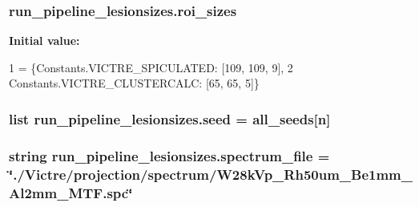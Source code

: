 \hypertarget{namespacerun__pipeline__lesionsizes_a3b75350f1aa1a1b47aa8ef34a06809db}{
\subsubsection[{roi\-\_\-sizes}]{\setlength{\rightskip}{0pt plus 5cm}run\-\_\-pipeline\-\_\-lesionsizes.\-roi\-\_\-sizes}}\label{namespacerun__pipeline__lesionsizes_a3b75350f1aa1a1b47aa8ef34a06809db}
{\bfseries Initial value\-:}
\begin{DoxyCode}
1 = \{Constants.VICTRE\_SPICULATED: [109, 109, 9],
2                  Constants.VICTRE\_CLUSTERCALC: [65, 65, 5]\}
\end{DoxyCode}
\hypertarget{namespacerun__pipeline__lesionsizes_ae359043ae5c4f2c1d8f12c0cdbffb932}{
\subsubsection[{seed}]{\setlength{\rightskip}{0pt plus 5cm}list run\-\_\-pipeline\-\_\-lesionsizes.\-seed = {\bf all\-\_\-seeds}\mbox{[}{\bf n}\mbox{]}}}\label{namespacerun__pipeline__lesionsizes_ae359043ae5c4f2c1d8f12c0cdbffb932}
\hypertarget{namespacerun__pipeline__lesionsizes_aa2e480913d7171fd2b0c89520bcec773}{
\subsubsection[{spectrum\-\_\-file}]{\setlength{\rightskip}{0pt plus 5cm}string run\-\_\-pipeline\-\_\-lesionsizes.\-spectrum\-\_\-file = \char`\"{}./Victre/projection/spectrum/W28k\-Vp\-\_\-\-Rh50um\-\_\-\-Be1mm\-\_\-\-Al2mm\-\_\-\-M\-T\-F.\-spc\char`\"{}}}\label{namespacerun__pipeline__lesionsizes_aa2e480913d7171fd2b0c89520bcec773}
